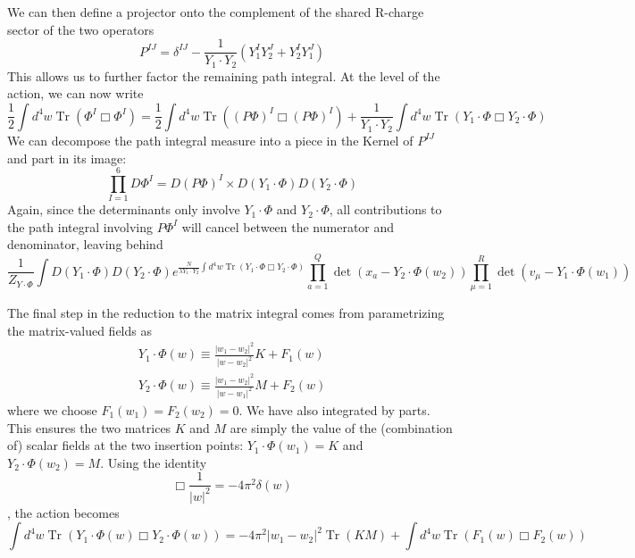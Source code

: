 \documentclass[english]{article}
\DeclareMathOperator{\Tr}{Tr}
\renewcommand{\>}{\rangle}
\newcommand{\<}{\langle}
\renewcommand{\(}{\left(}
\renewcommand{\)}{\right)}
\begin{document}
We can then define a projector onto the complement of the shared R-charge sector of the two operators 
\begin{equation}
    P^{I J} = \delta^{IJ}-\frac{1}{ Y_1 \cdot Y_{2}} \left( Y_{1}^{I} Y_{2}^{J}+ Y_{2}^{I} Y_{1}^{J}\right)
\end{equation}
This allows us to further factor the remaining path integral. At the level of the action, we can now write
\begin{equation}
    \frac{1}{2} \int d^{4}w \Tr \left( \Phi^{I} \Box \Phi^{I} \right) =  \frac{1}{2} \int d^{4}w \Tr \left( (P \Phi)^{I} \Box (P \Phi)^{I} \right) + \frac{1}{Y_{1}\cdot Y_{2}}\int d^{4}w \Tr \left( Y_{1}\cdot \Phi \Box Y_{2} \cdot \Phi \right)
\end{equation}
We can decompose the path integral measure into a piece in the Kernel of $P^{IJ}$ and part in its image:
\begin{equation}
 \prod_{I=1}^{6} D\Phi^{I} = D(P\Phi)^{I} \times D (Y_{1} \cdot \Phi) D (Y_{2} \cdot \Phi)
\end{equation}
Again, since the determinants only involve $Y_1 \cdot \Phi$ and $Y_2 \cdot \Phi$, all contributions to the path integral involving $P \Phi^{I} $ will cancel between the numerator and denominator, leaving behind
\begin{equation}
    \frac{1}{Z_{Y\cdot \Phi}} \int D (Y_{1} \cdot \Phi) D (Y_{2} \cdot \Phi) e^{\frac{N}{\lambda Y_{1} \cdot Y_{2} } \int d^{4}w \Tr \left( Y_{1}\cdot \Phi \Box Y_{2} \cdot \Phi \right)} \prod_{a=1}^{Q} \det \left( x_{a}-Y_2 \cdot \Phi(w_{2}) \right) \prod_{\mu=1}^{R} \det\left(v_{\mu}-Y_1 \cdot \Phi(w_{1}) \right)
\end{equation}

The final step in the reduction to the matrix integral comes from parametrizing the matrix-valued fields as 
\begin{align}
    Y_1 \cdot \Phi(w)   \equiv  \frac{|w_1 -w_{2}|^2}{|w-w_{2}|^2}K +  F_1(w) \\
      Y_2 \cdot \Phi(w)   \equiv \frac{|w_1 -w_{2}|^2}{|w-w_{1}|^2} M + F_2(w)
\end{align}
where we choose $F_{1}(w_1)= F_{2}(w_2)=0$.  We have also integrated by parts. This ensures the two matrices $K$ and $M$ are simply the value of the (combination of) scalar fields at the two insertion points: $ Y_1 \cdot \Phi(w_1)=K$ and $ Y_2 \cdot \Phi(w_2)=M$. 
Using the identity 
\begin{equation}
    \Box \frac{1}{|w|^2} = -4\pi^2 \delta(w)
\end{equation}, 
the action becomes
\begin{equation}
    \int d^{4}w  \Tr \left( Y_1 \cdot \Phi(w)  \Box Y_2 \cdot \Phi(w) \right) = - 4\pi^2 |w_{1} -w_{2}|^2 \Tr \left( KM \right) +  \int d^{4}w \Tr (F_{1} (w) \Box F_{2}(w)) 
\end{equation}
\end{document}
